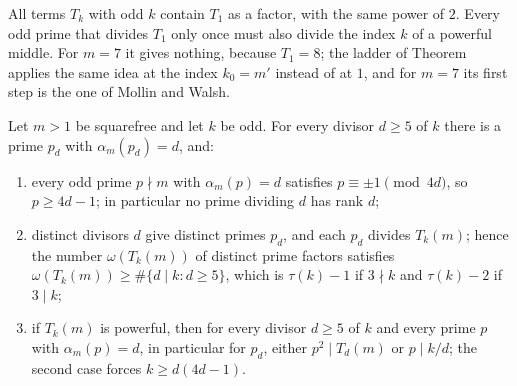 \inwords All terms $T_k$ with odd $k$ contain $T_1$ as a factor, with the same power of $2$. Every odd prime that divides $T_1$ only once
must also divide the index $k$ of a powerful middle. For $m = 7$ it gives nothing, because $T_1 = 8$; the ladder of Theorem~ applies the same idea at the index $k_0 = m'$ instead of at $1$, and
for $m = 7$ its first step is the one of Mollin and Walsh.

\begin{corollary}
Let $m > 1$ be squarefree and let $k$ be odd. For every divisor $d \ge 5$ of $k$ there is a prime $p_d$ with $\alpha_m(p_d) = d$, and:
\begin{enumerate}
  \item[(i)] every odd prime $p \nmid m$ with $\alpha_m(p) = d$ satisfies $p \equiv \pm 1 \pmod{4d}$, so $p \ge 4d - 1$; in particular no
  prime dividing $d$ has rank $d$;
  \item[(ii)] distinct divisors $d$ give distinct primes $p_d$, and each $p_d$ divides $T_k(m)$; hence the number $\omega(T_k(m))$ of distinct
  prime factors satisfies $\omega(T_k(m)) \ge \#\{d \mid k : d \ge 5\}$, which is $\tau(k) - 1$ if $3 \nmid k$ and $\tau(k) - 2$ if $3 \mid k$;
  \item[(iii)] if $T_k(m)$ is powerful, then for every divisor $d \ge 5$ of $k$ and every prime $p$ with $\alpha_m(p) = d$, in particular for $p_d$, either $p^2 \mid T_d(m)$ or $p \mid k/d$; the second case
  forces $k \ge d(4d - 1)$.
\end{enumerate}
\end{corollary}

